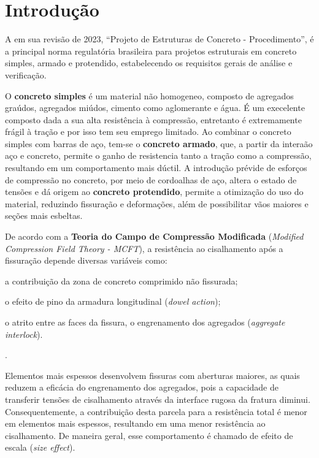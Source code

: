\chapter[Introdução]{Introdução}

A \textcite{NBR6118:2023} em sua revisão de 2023, “Projeto de Estruturas de Concreto - Procedimento”, é a principal norma regulatória brasileira para projetos estruturais em concreto simples, armado e protendido, estabelecendo os requisitos gerais de análise e verificação.

O \textbf{concreto simples} é um material não homogeneo, composto de agregados graúdos, agregados miúdos, cimento como aglomerante e água. É um execelente composto dada a sua alta resistência à compressão, entretanto é extremamente frágil à tração e por isso tem seu emprego limitado. Ao combinar o concreto simples com barras de aço, tem-se o \textbf{concreto armado}, que, a partir da interaão aço e concreto, permite o ganho de resistencia tanto a tração como a compressão, resultando em um comportamento mais dúctil. A introdução prévide de esforços de compressão no concreto, por meio de cordoalhas de aço, altera o estado de tensões e dá origem ao \textbf{concreto protendido}, permite a otimização do uso do material, reduzindo fissuração e deformações, além de possibilitar vãos maiores e seções mais esbeltas.\cite{Araujo2023}


De acordo com a \textbf{Teoria do Campo de Compressão Modificada} (\textit{Modified Compression Field Theory - MCFT}), a resistência ao cisalhamento após a fissuração depende diversas variáveis como:

\begin{alineas}
\item a contribuição da zona de concreto comprimido não fissurada;
\item o efeito de pino da armadura longitudinal (\textit{dowel action});
\item o atrito entre as faces da fissura, o engrenamento dos agregados (\textit{aggregate interlock}).
\end{alineas}.

\cite{Vecchio1986}

Elementos mais espessos desenvolvem fissuras com aberturas maiores, as quais reduzem a eficácia do engrenamento dos agregados, pois a capacidade de transferir tensões de cisalhamento através da interface rugosa da fratura diminui. Consequentemente, a contribuição desta parcela para a resistência total é menor em elementos mais espessos, resultando em uma menor resistência ao cisalhamento. De maneira geral, esse comportamento é chamado de efeito de escala (\textit{size effect}).


